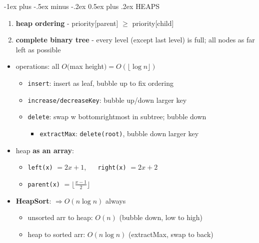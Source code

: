 \documentclass[10pt, landscape]{article}
\makeatletter
\renewcommand{\section}{\@startsection{section}{1}{0mm}%
                                {-1ex plus -.5ex minus -.2ex}%
                                {0.5ex plus .2ex}%
                                {\normalfont\large\bfseries}}
\newcommand{\floor}[1]{\lfloor #1 \rfloor}
\let\then\Rightarrow
\newcommand{\code}[1]{\textcolor{myblue}{\texttt{#1}}}
\makeatother
\begin{document}
\begin{multicols}{4}
\section{HEAPS}
\begin{enumerate}
    \item \textbf{heap ordering} - priority[parent] $\geq$ priority[child]
    \item \textbf{complete binary tree} - every level (except last level) is full; all nodes as far left as possible
\end{enumerate}
\begin{itemize}
    \item operations: all $O($max height$) = O(\floor{\log n})$
    \begin{itemize}
        \item \code{insert}: insert as leaf, bubble up to fix ordering
        \item \code{increase/decreaseKey}: bubble up/down larger key
        \item \code{delete}: swap w bottomrightmost in subtree; bubble down
        \begin{itemize}
            \item \code{extractMax}: \code{delete(root)}, bubble down larger key
        \end{itemize} 
    \end{itemize}
    \item heap \textbf{as an array}:
    \begin{itemize}
        \item \code{left(x)} $= 2x + 1$, $\quad$ \code{right(x)} $= 2x + 2$
        \item \code{parent(x)} $= \floor{\frac{x-1}{2}}$
    \end{itemize}
    \item \textbf{HeapSort}: $\then O(n \log n)$ always
    \begin{itemize}
        \item unsorted arr to heap: $O(n)$ (bubble down, low to high)
        \item heap to sorted arr: $O(n \log n)$ (extractMax, swap to back)
    \end{itemize}
\end{itemize}


\end{multicols}
\end{document}
